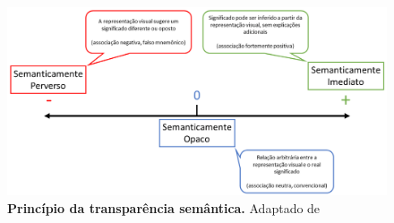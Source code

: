 \begin{figure}[h]
    \includegraphics[scale=0.48]{2-fundamentacao-teorica/imagens/transparencia-semantica.png}
    \centering
    \caption[Princípio da transparência semântica.]{\textbf{Princípio da transparência semântica.} Adaptado de~\cite{MOODY-2009-Physics-Notation}}
    \label{fig:transparencia-semantica}
\end{figure}